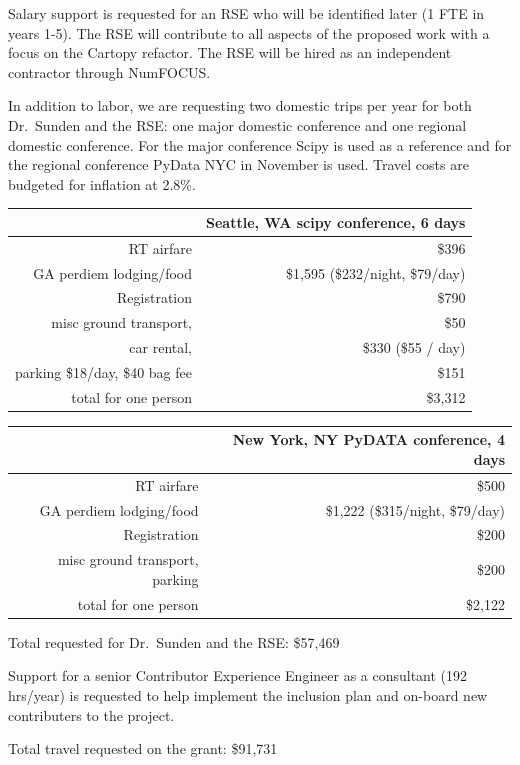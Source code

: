 \documentclass[12pt]{article}
\numberwithin{page}{section}
\begin{document}
Salary support is requested for an RSE who will be identified later (1 FTE in
years 1-5).  The RSE will contribute to all aspects of the proposed work with a
focus on the Cartopy refactor.  The RSE will be hired as an independent
contractor through NumFOCUS.

In addition to labor, we are requesting two domestic trips per year for both
Dr.\ Sunden and the RSE:  one major domestic conference and one regional
domestic conference.  For the major conference Scipy is used as a reference and
for the regional conference PyData NYC in November is used.  Travel costs are
budgeted for inflation at 2.8\%.

\begin{tabular}{|r|r|}
  \hline
  & Seattle, WA scipy conference, 6 days\\\hline
  RT airfare & \$396 \\\hline
  GA perdiem lodging/food & \$1,595 (\$232/night, \$79/day) \\\hline
  Registration & \$790 \\\hline
  misc ground transport, & \$50 \\\hline
  car rental, & \$330 (\$55 / day) \\\hline
  parking \@ \$18/day, \$40 bag fee & \$151 \\\hline\hline
  total for one person & \$3,312    \\\hline
\end{tabular}


\begin{tabular}{|r|r|}
  \hline
  & New York, NY  PyDATA conference, 4 days\\\hline
  RT airfare & \$500     \\\hline
  GA perdiem lodging/food & \$1,222 (\$315/night, \$79/day) \\\hline
  Registration & \$200     \\\hline
  misc ground transport, parking & \$200     \\\hline\hline
  total for one person & \$2,122     \\\hline
\end{tabular}

Total requested for Dr.\ Sunden and the RSE: \$57,469

Support for a senior Contributor Experience Engineer as a consultant (192 hrs/year)
is requested to help implement the inclusion plan and on-board new contributers
to the project.

Total travel requested on the grant: \$91,731
\end{document}
